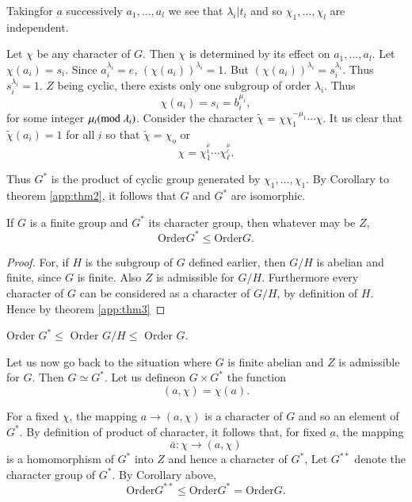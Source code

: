 Taking\pageoriginale for $\underbar{a}$ successively $a_1 ,\ldots,a_l$
we see that $\lambda_i|t_i$ and so $\chi_1 ,\ldots, \chi_l$ are
independent.   

Let $\chi$ be any character of $G$. Then $\chi$ is determined by its
effect on $a_1 , \ldots , a_l$. Let $\chi (a_i) = s_i$. Since
$a_i^{\lambda_i} = e$, $(\chi(a_i))^{\lambda_i} = 1$. But  $(\chi(a_i)
)^{\lambda_i} = s_i^{\lambda_i}$. Thus $s_i^{\lambda_i} = 1$. $Z$
being cyclic, there exists only one subgroup of order
$\lambda_i$. Thus 
$$
\chi (a_i) = s_i = b_i^{\mu_i}, 
$$
for some integer $\mu_i ({\rm mod}\; \lambda_i)$. Consider the character
$\tilde{\chi} = \chi  \chi_1^{-\mu_1} \cdots \chi$. It us clear that
$\tilde{\chi} (a_i) = 1$ for all $\underbar{i}$ so that $\tilde{\chi}=
\chi_o$ or  
$$
\chi = \chi^{^\mu_1}_1 \cdots \chi_\ell^{^\mu_\ell} .
$$

Thus $G^*$ is the product of cyclic group generated by  $\chi_1
,\ldots, \chi_1$. By Corollary to theorem \ref{app:thm2}, it follows
that $G$ and $G^*$ are isomorphic.  

\begin{coro*} 
If $G$ is a finite group and $G^*$ its character group, then whatever
may be $Z$, 
$$
\text{Order} G^* \le \text{Order} G.
$$
\end{coro*}

\begin{proof}
For, if $H$ is the subgroup of $G$ defined earlier, then $G/H$ is
abelian and finite, since $G$ is finite. Also $Z$ is admissible for
$G/H$. Furthermore every character of $G$ can be considered as a
character of $G/H$, by definition of $H$. Hence by theorem \ref{app:thm3}  
\end{proof}

Order $G^* \leq $ Order $G/H \le$ Order $G$. 

Let us now go back to the situation where $G$ is finite abelian and
$Z$ is admissible for $G$. Then $G \simeq G^*$. Let us
define\pageoriginale on $G \times G^*$ the function  
$$
(a, \chi) = \chi (a).
$$ 

For a fixed $\chi$, the mapping $a \to (a, \chi)$ is a character of
$G$ and so an element of $G^*$. By definition of product of character,
it follows that, for fixed $\underbar{a}$, the mapping   
$$
\bar{a} : \chi \to (a, \chi)
$$
is a homomorphism of $G^*$ into $Z$ and hence a character of $G^*$,
Let $G^{**}$ denote the character group of $G^*$. By Corollary above, 
$$
\text{Order} G^{**} \leq \text{Order} G^* = \text{Order} G.
$$
 

